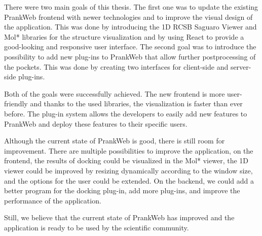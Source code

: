 
\label{chap:conclusion}

There were two main goals of this thesis. The first one was to update the existing PrankWeb frontend with newer technologies and to improve the visual design of the application. This was done by introducing the 1D RCSB Saguaro Viewer and Mol* libraries for the structure visualization and by using React to provide a good-looking and responsive user interface. The second goal was to introduce the possibility to add new plug-ins to PrankWeb that allow further postprocessing of the pockets. This was done by creating two interfaces for client-side and server-side plug-ins.

Both of the goals were successfully achieved. The new frontend is more user-friendly and thanks to the used libraries, the visualization is faster than ever before. The plug-in system allows the developers to easily add new features to PrankWeb and deploy these features to their specific users.

Although the current state of PrankWeb is good, there is still room for improvement. There are multiple possibilities to improve the application, on the frontend, the results of docking could be visualized in the Mol* viewer, the 1D viewer could be improved by resizing dynamically according to the window size, and the options for the user could be extended. On the backend, we could add a better program for the docking plug-in, add more plug-ins, and improve the performance of the application.

Still, we believe that the current state of PrankWeb has improved and the application is ready to be used by the scientific community.
